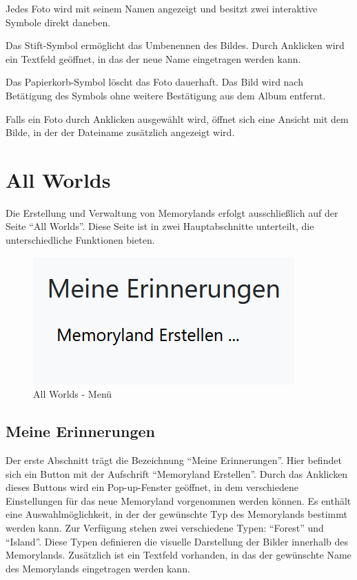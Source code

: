 Jedes Foto wird mit seinem Namen angezeigt und besitzt zwei interaktive Symbole direkt 
daneben.

Das Stift-Symbol ermöglicht das Umbenennen des Bildes. Durch Anklicken wird ein Textfeld 
geöffnet, in das der neue Name eingetragen werden kann.

Das Papierkorb-Symbol löscht das Foto dauerhaft. Das Bild wird nach Betätigung des Symbols 
ohne weitere Bestätigung aus dem Album entfernt.

Falls ein Foto durch Anklicken ausgewählt wird, öffnet sich eine Ansicht mit dem Bilde, 
in der der Dateiname zusätzlich angezeigt wird. 

\section{All Worlds}

Die Erstellung und Verwaltung von Memorylands erfolgt ausschlie\ss{}lich auf der Seite 
``All Worlds''. Diese Seite ist in zwei Hauptabschnitte unterteilt, die 
unterschiedliche Funktionen bieten.

\begin{figure}
    \centering
    \includegraphics[scale=0.7]{pics/all_worlds_teil1.PNG}
    \caption{All Worlds - Menü}
    \label{fig:all-worlds-menu}
\end{figure}

\subsection{Meine Erinnerungen}

Der erste Abschnitt trägt die Bezeichnung ``Meine Erinnerungen''. Hier befindet 
sich ein Button mit der Aufschrift ``Memoryland Erstellen''. Durch das Anklicken 
dieses Buttons wird ein Pop-up-Fenster geöffnet, in dem verschiedene Einstellungen 
für das neue Memoryland vorgenommen werden können. Es enthält eine Auswahlmöglichkeit, 
in der der gewünschte Typ des Memorylands bestimmt werden kann. Zur Verfügung stehen 
zwei verschiedene Typen: ``Forest'' und ``Island''. Diese Typen definieren die 
visuelle Darstellung der Bilder innerhalb des Memorylands. Zusätzlich ist ein 
Textfeld vorhanden, in das der gewünschte Name des Memorylands eingetragen werden 
kann.

